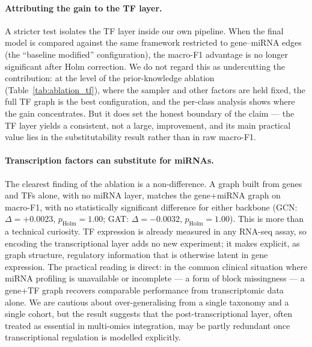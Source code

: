 \documentclass[review,3p,times,11pt, ]{elsarticle} %
\begin{document}
\paragraph{Attributing the gain to the TF layer.}
A stricter test isolates the TF layer inside our own pipeline. When the
final model is compared against the same framework restricted to
gene--miRNA edges (the ``baseline modified'' configuration), the
macro-F1 advantage is no longer significant after Holm correction.
We do not regard this as undercutting the contribution: at the level
of the prior-knowledge ablation (Table~\ref{tab:ablation_tf}), where the
sampler and other factors are held fixed, the full TF graph is the best
configuration, and the per-class analysis shows where the gain
concentrates. But it does set the honest boundary of the claim — the
TF layer yields a consistent, not a large, improvement, and its main
practical value lies in the substitutability result rather than in
raw macro-F1.

\paragraph{Transcription factors can substitute for miRNAs.}
The clearest finding of the ablation is a non-difference. A graph built
from genes and TFs alone, with no miRNA layer, matches the gene+miRNA
graph on macro-F1, with no statistically significant difference for
either backbone (GCN: $\Delta = +0.0023$, $p_{\text{Holm}} = 1.00$;
GAT: $\Delta = -0.0032$, $p_{\text{Holm}} = 1.00$). This is more than a
technical curiosity. TF expression is already measured in any RNA-seq
assay, so encoding the transcriptional layer adds no new experiment; it
makes explicit, as graph structure, regulatory information that is
otherwise latent in gene expression. The practical reading is direct:
in the common clinical situation where miRNA profiling is unavailable or
incomplete — a form of block missingness — a gene+TF graph recovers
comparable performance from transcriptomic data alone. We are cautious
about over-generalising from a single taxonomy and a single cohort, but
the result suggests that the post-transcriptional layer, often treated
as essential in multi-omics integration, may be partly redundant once
transcriptional regulation is modelled explicitly.
\end{document}
